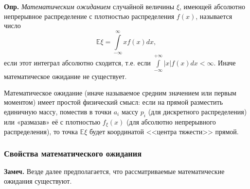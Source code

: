 \documentclass[oneside,final,14pt]{extreport}
\newcommand\mydef{{\bf Опр.}}
\newcommand\mynote{{\bf Замеч.}}
\theoremstyle{definition}
\begin{document}
\mydef{} {\it Математическим ожиданием} случайной величины $\xi$, имеющей абсолютно непрерывное распределение с плотностью распределения $f(x)$, называется число
$$\mathbb{E} \xi=\int\limits_{-\infty}^{\infty} x f(x) dx,$$
если этот интеграл абсолютно сходится, т.е. если $\int\limits_{-\infty}^{+\infty}|x|f(x)dx < \infty.$ Иначе математическое ожидание не существует.

Математическое ожидание (иначе называемое средним значением или
первым моментом) имеет простой физический смысл: если на прямой разместить единичную массу, поместив в точки $a_i$ массу $p_i$ (для дискретного распределения) или «размазав» её с плотностью $f_\xi(x)$ (для абсолютно непрерывного распределения), то точка $\mathbb{E}\xi$ будет координатой <<центра тяжести>> прямой.

\subsubsection{Свойства математического ожидания}
\mynote{} Везде далее предполагается, что рассматриваемые математические ожидания существуют.
\end{document}
